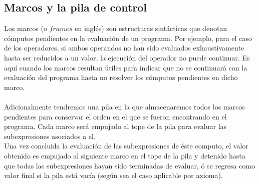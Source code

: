 \bigskip

 \subsection{Marcos y la pila de control}
  Los marcos (o $frames$ en inglés) son estructuras sintácticas que denotan cómputos pendientes en la evaluación de un programa. Por ejemplo, para el caso de los operadores, si ambos operandos no han sido evaluados exhaustivamente hasta ser reducidos a un valor, la ejecución del operador no puede continuar.
 Es aquí cuando los marcos resultan útiles para indicar que no se continuará con la evaluación del programa hasta no resolver los cómputos pendientes en dicho marco.\\\\
Adicionalmente tendremos una pila en la que almacenaremos todos los marcos pendientes para conservar el orden en el que se fueron encontrando en el programa.  Cada marco será empujado al tope de la pila para evaluar las subexpresiones asociados a el. \\
Una vez concluida la evaluación de las subexpresiones de éste computo, el valor obtenido es empujado al siguiente marco en el tope de la pila y detenido hasta que todas las subexpresiones hayan sido terminadas de evaluar, ó se regresa como valor final si la pila está vacía (según sea el caso aplicable por axioma). \\\\
